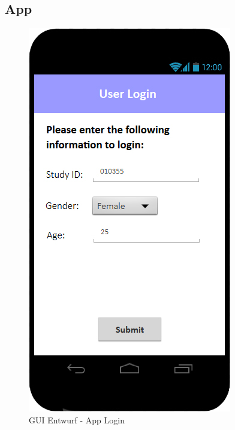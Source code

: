 \documentclass[a4paper]{scrreprt}
\begin{document}
        \newpage
        \subsection{App}
            \vspace*{2cm}
            \begin{figure}[ht]
                \centering
                \includegraphics[scale = 0.3]{android_login.jpg}
                \caption{GUI Entwurf - App Login}
            \end{figure}
    
\end{document}
